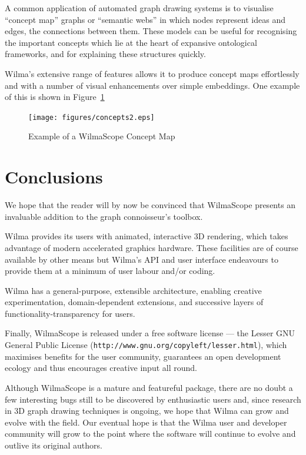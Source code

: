 \documentclass[runningheads]{cl2emult}
\newcommand{\url}[1]{{\small{\tt #1}}}
\begin{document}
A common application of automated graph drawing systems is to visualise
``concept map'' graphs or ``semantic webs'' in which nodes represent ideas and edges, the
connections between them.  These models can be useful for recognising
the important concepts which lie at the heart of expansive ontological
frameworks, and for explaining these structures quickly.

Wilma's extensive range of features allows it to produce concept maps
effortlessly and with a number of visual enhancements over simple
embeddings.  One example of this is shown in Figure~\ref{fig-concept}

\begin{figure}
\begin{center}
\texttt{[image: figures/concepts2.eps]} \\
\caption{Example of a WilmaScope Concept Map}
\label{fig-concept}
\end{center}
\end{figure}

\section{Conclusions}
\label{sec:conclusions}

We hope that the reader will by now be convinced that WilmaScope presents an
invaluable addition to the graph connoisseur's toolbox.  

Wilma provides its users with animated, interactive 3D rendering, which takes
advantage of modern accelerated graphics hardware.  These facilities are of
course available by other means but Wilma's API and user interface
endeavours to provide them at a minimum of user labour and/or coding.

Wilma has a general-purpose, extensible architecture, enabling creative
experimentation, domain-dependent extensions, and successive layers of
functionality-transparency for users.

Finally, WilmaScope is released under a free software license --- the Lesser
GNU General Public License (\url{http://www.gnu.org/copyleft/lesser.html}),
which maximises benefits for the user community, guarantees an open
development ecology and thus encourages creative input all round.

Although WilmaScope is a mature and featureful package, there are no doubt a
few interesting bugs still to be discovered by enthusiastic users and, since
research in 3D graph drawing techniques is ongoing, we hope that Wilma can
grow and evolve with the field.  Our eventual hope is that the Wilma
user and developer community will grow to the point where the software
will 
continue to evolve and outlive its original authors.
\end{document}
